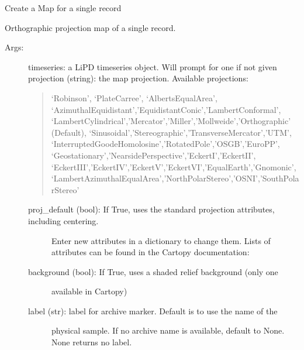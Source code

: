 \documentclass[letterpaper,10pt,english]{sphinxmanual}
\begin{document}
\begin{fulllineitems}
\label{\detokenize{Main:pyleoclim.mapLipd}}
Create a Map for a single record

Orthographic projection map of a single record.
\begin{description}
\item[{Args:}] \leavevmode
timeseries: a LiPD timeseries object. Will prompt for one if not given
projection (string): the map projection. Available projections:
\begin{quote}

‘Robinson’, ‘PlateCarree’, ‘AlbertsEqualArea’,
‘AzimuthalEquidistant’,’EquidistantConic’,’LambertConformal’,
‘LambertCylindrical’,’Mercator’,’Miller’,’Mollweide’,’Orthographic’ (Default),
‘Sinusoidal’,’Stereographic’,’TransverseMercator’,’UTM’,
‘InterruptedGoodeHomolosine’,’RotatedPole’,’OSGB’,’EuroPP’,
‘Geostationary’,’NearsidePerspective’,’EckertI’,’EckertII’,
‘EckertIII’,’EckertIV’,’EckertV’,’EckertVI’,’EqualEarth’,’Gnomonic’,
‘LambertAzimuthalEqualArea’,’NorthPolarStereo’,’OSNI’,’SouthPolarStereo’
\end{quote}
\begin{description}
\item[{proj\_default (bool): If True, uses the standard projection attributes, including centering.}] \leavevmode
Enter new attributes in a dictionary to change them. Lists of attributes
can be found in the Cartopy documentation:
\begin{quote}

\end{quote}

\item[{background (bool): If True, uses a shaded relief background (only one }] \leavevmode
available in Cartopy)

\item[{label (str): label for archive marker. Default is to use the name of the }] \leavevmode
physical sample. If no archive name is available, default to
None. None returns no label.

\end{description}


\end{description}
\end{fulllineitems}
\end{document}
